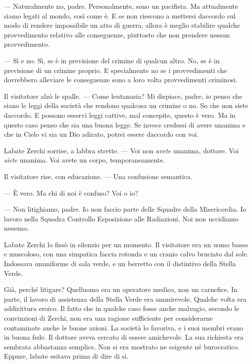 --- Naturalmente no, padre. Personalmente, sono un pacifista. Ma
attualmente siamo legati al mondo, così come è. E se non riescono a
mettersi d\textquotesingle accordo sul modo di rendere impossibile un
atto di guerra, allora è meglio stabilire qualche provvedimento relativo
alle conseguenze, piuttosto che non prendere nessun provvedimento.

--- Sì e no. Sì, se è in previsione del crimine di qualcun altro. No, se
è in previsione di un crimine proprio. E specialmente no se i
provvedimenti che dovrebbero alleviare le conseguenze sono a loro volta
provvedimenti criminosi.

Il visitatore alzò le spalle. --- Come l\textquotesingle eutanasia? Mi
dispiace, padre, io penso che siano le leggi della società che rendono
qualcosa un crimine o no. So che non siete d\textquotesingle accordo. E
possono esservi leggi cattive, mal concepite, questo è vero. Ma in
questo caso penso che sia una buona legge. Se invece credessi di avere
un\textquotesingle anima e che in Cielo vi sia un Dio adirato, potrei
essere d\textquotesingle accordo con voi.

L\textquotesingle abate Zerchi sorrise, a labbra strette. --- Voi non
\emph{avete} un\textquotesingle anima, dottore. Voi \emph{siete}
un\textquotesingle anima. Voi avete un corpo, temporaneamente.

Il visitatore rise, con educazione. --- Una confusione semantica.

--- È vero. Ma chi di noi è confuso? Voi o io?

--- Non litighiamo, padre. Io non faccio parte delle Squadre della
Misericordia. Io lavoro nella Squadra Controllo Esposizione alle
Radiazioni. Noi non uccidiamo nessuno.

L\textquotesingle abate Zerchi lo fissò in silenzio per un momento. Il
visitatore era un uomo basso e muscoloso, con una simpatica faccia
rotonda e un cranio calvo bruciato dal sole. Indossava
un\textquotesingle uniforme di sala verde, e un berretto con il
distintivo della Stella Verde.

Già, perché litigare? Quell\textquotesingle uomo era un operatore
medico, non un carnefice. In parte, il lavoro di assistenza della Stella
Verde era ammirevole. Qualche volta era addirittura eroico. Il fatto che
in qualche caso fosse anche malvagio, secondo le convinzioni di Zerchi,
non era una ragione sufficiente per considerarne contaminate anche le
buone azioni. La società lo favoriva, e i suoi membri erano in buona
fede. Il dottore aveva cercato di essere amichevole. La sua richiesta
era sembrata abbastanza semplice. Non si era mostrato ne esigente né
burocratico. Eppure, l\textquotesingle abate esitava prima di dire di
sì.

